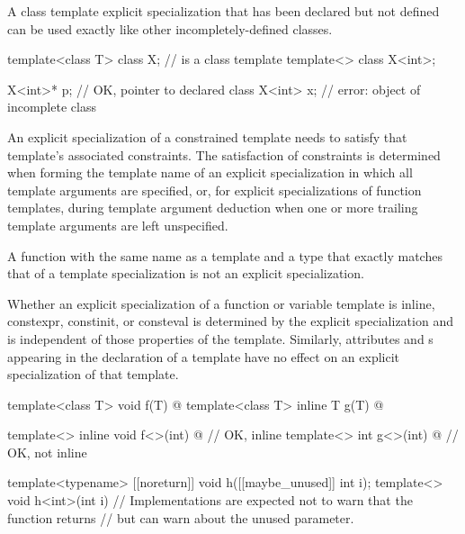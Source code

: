 \pnum
\begin{note}
A class template explicit specialization that has been declared but
not defined can be used exactly like other
incompletely-defined classes.
\begin{example}
\begin{codeblock}
template<class T> class X;                      //  is a class template
template<> class X<int>;

X<int>* p;                                      // OK, pointer to declared class 
X<int> x;                                       // error: object of incomplete class 
\end{codeblock}
\end{example}
\end{note}

\pnum
\begin{note}
An explicit specialization of a constrained template needs
to satisfy that template's associated constraints.
The satisfaction of constraints is determined
when forming the template name of an explicit specialization
in which all template arguments are specified,
or, for explicit specializations of function templates,
during template argument deduction
when one or more trailing template arguments are left unspecified.
\end{note}

\pnum
A function with the same name as a template and a type that exactly matches that
of a template specialization is not an explicit specialization.

\pnum
Whether an explicit specialization of a function or variable template
is inline, constexpr, constinit, or consteval
is determined by the explicit specialization and
is independent of those properties of the template.
Similarly,
attributes and s
appearing in the declaration of a template
have no effect on an explicit specialization of that template.
\begin{example}
\begin{codeblock}
template<class T> void f(T) { @\commentellip@ }
template<class T> inline T g(T) { @\commentellip@ }

template<> inline void f<>(int) { @\commentellip@ }   // OK, inline
template<> int g<>(int) { @\commentellip@ }           // OK, not inline

template<typename> [[noreturn]] void h([[maybe_unused]] int i);
template<> void h<int>(int i) {
    // Implementations are expected not to warn that the function returns
    // but can warn about the unused parameter.
}
\end{codeblock}
\end{example}

